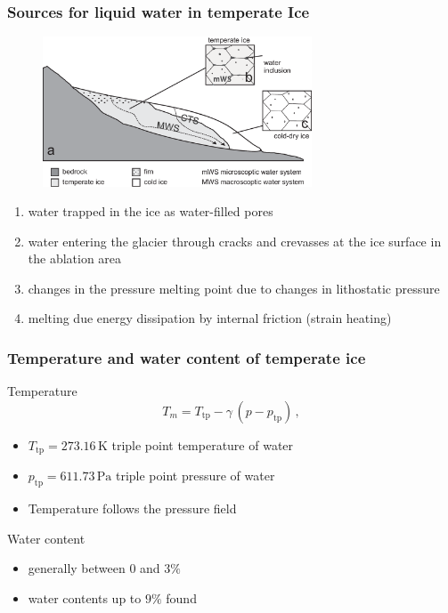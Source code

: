 \documentclass[hide notes,intlimits]{beamer}
\newcommand{\unit}[1]{\ensuremath{\,\text{#1}}}
\begin{document}
\begin{frame}
  \frametitle{Sources for liquid water in temperate Ice}
  \vspace{-1em}
  \begin{figure}
    \includegraphics[width=8cm]{figures/mws}
  \end{figure}
  \begin{enumerate} \small
  \item<1-2> water trapped in the ice as water-filled pores
  \item<1-2> water entering the glacier through cracks and crevasses at the ice surface in the ablation area
  \item<1,3> changes in the pressure melting point due to changes in lithostatic pressure
  \item<1,3> melting due energy dissipation by internal friction (strain heating) 
  \end{enumerate}  
\end{frame}




\begin{frame}
  \frametitle{Temperature and water content of temperate ice}
  \begin{block}{Temperature}
    \begin{equation}
      \label{eq:clausius-pure}
      T_m = T_{\text{tp}} - \gamma\, (p - p_{\text{tp}})\,,
    \end{equation}
    \begin{itemize}
    \item $T_{\text{tp}}=273.16\unit{K}$ triple point temperature of water
    \item $p_{\text{tp}}=611.73\unit{Pa}$ triple point pressure of water
    \item Temperature follows the pressure field
    \end{itemize}
  \end{block}
  \begin{block}{Water content}
    \begin{itemize}
    \item generally between 0 and $3\%$
    \item water contents up to $9\%$ found
    \end{itemize}
  \end{block}
\end{frame}
\end{document}
